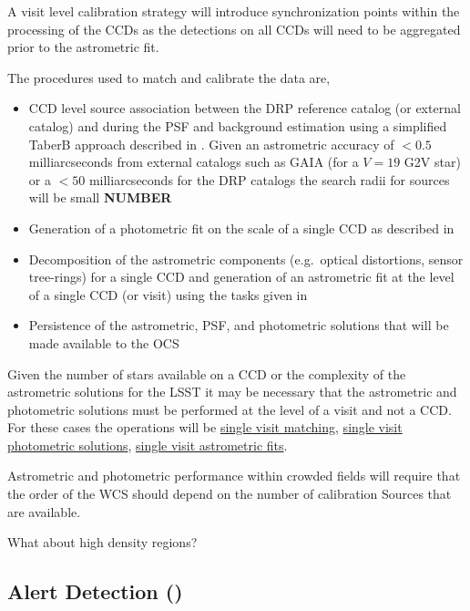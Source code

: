 A visit level calibration strategy will introduce synchronization points within the processing of the CCDs as the detections on all CCDs will need to be aggregated prior to the astrometric fit.

The procedures used to match and calibrate the data are,
\begin{itemize}
\item CCD level source association between the DRP reference catalog
  (or external catalog) and \Sources  during the PSF and background
  estimation using a simplified TaberB approach described in \hyperref[sec:acSingleCCDReferenceMatching]{}. Given an astrometric accuracy of $<0.5$ milliarcseconds from external catalogs such as GAIA (for a $V=19$ G2V star) or a $<50$ milliarcseconds for the DRP catalogs the search radii for sources will be small {\bf NUMBER}
\item Generation of a photometric fit on the scale of a single CCD as described in \hyperref[sec:acSingleCCDPhotometricFit]{}
\item Decomposition of the astrometric components (e.g.\ optical distortions, sensor tree-rings) for a single CCD and generation of  an astrometric fit at the level of a single CCD (or visit) using the tasks given in \hyperref[sec:acSingleCCDAstrometricFit]{}
\item Persistence of the astrometric, PSF, and photometric solutions that will be made available to the OCS 
\end{itemize}

Given the number of stars available on a CCD or the complexity of the astrometric solutions for the LSST it may be necessary that the astrometric and photometric solutions must be performed at the level of a visit and not a CCD.  For these cases the operations will be \hyperref[sec:acSingleVisitReferenceMatching]{single visit matching},   \hyperref[sec:acSingleCCDPhotometricFit]{single visit photometric solutions}, \hyperref[sec:acSingleVisitAstrometricFit]{single visit astrometric fits}.

Astrometric and photometric performance within crowded fields will require that the order of the WCS should depend on the number of calibration Sources that are available.

\begin{note} What about high density regions? \end{note}

\subsection{Alert Detection (\wbsDiffim)}
\label{sec:apAlertDetection}

